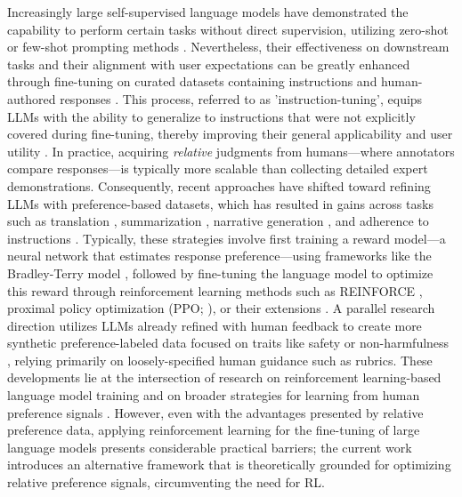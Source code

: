 Increasingly large self-supervised language models have demonstrated the capability to perform certain tasks without direct supervision, utilizing zero-shot \citep{radford2019language} or few-shot prompting methods \citep{gpt3,megatron,chowdhery2022palm}. Nevertheless, their effectiveness on downstream tasks and their alignment with user expectations can be greatly enhanced through fine-tuning on curated datasets containing instructions and human-authored responses \citep{mishra-etal-2022-cross,sanh2022multitask,chung2022scaling,thoppilan2022lamda}. This process, referred to as 'instruction-tuning', equips LLMs with the ability to generalize to instructions that were not explicitly covered during fine-tuning, thereby improving their general applicability and user utility \citep{chung2022scaling}. In practice, acquiring \textit{relative} judgments from humans—where annotators compare responses—is typically more scalable than collecting detailed expert demonstrations. Consequently, recent approaches have shifted toward refining LLMs with preference-based datasets, which has resulted in gains across tasks such as translation \citep{kreutzer-etal-2018-reliability}, summarization \citep{stiennon2022learning,ziegler2020finetuning}, narrative generation \citep{ziegler2020finetuning}, and adherence to instructions \citep{ouyang2022training,ramamurthy2023is}. Typically, these strategies involve first training a reward model—a neural network that estimates response preference—using frameworks like the Bradley-Terry model \citep{bradley1952rankanalysis}, followed by fine-tuning the language model to optimize this reward through reinforcement learning methods such as REINFORCE \citep{williams1992reinforce}, proximal policy optimization (PPO; \cite{schulman2017proximal}), or their extensions \citep{ramamurthy2023is}. A parallel research direction utilizes LLMs already refined with human feedback to create more synthetic preference-labeled data focused on traits like safety or non-harmfulness \citep{bai2022constitutional}, relying primarily on loosely-specified human guidance such as rubrics. These developments lie at the intersection of research on reinforcement learning-based language model training \citep{Ranzato2015SequenceLT,paulus2018a,wu2018learning} and on broader strategies for learning from human preference signals \citep{christiano2017deep,kupcsik2018learning}. However, even with the advantages presented by relative preference data, applying reinforcement learning for the fine-tuning of large language models presents considerable practical barriers; the current work introduces an alternative framework that is theoretically grounded for optimizing relative preference signals, circumventing the need for RL.

